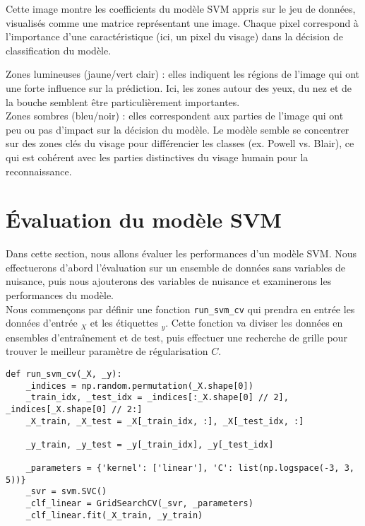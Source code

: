 \documentclass{article}
\begin{document}
\begin{itemize}
Cette image montre les coefficients du modèle SVM appris sur le jeu de
données, visualisés comme une matrice représentant une image. Chaque 
pixel correspond à l'importance d'une caractéristique (ici, un pixel du 
visage) dans la décision de classification du modèle.

Zones lumineuses (jaune/vert clair) : elles indiquent les régions de 
l'image qui ont une forte influence sur la prédiction. Ici, les zones 
autour des yeux, du nez et de la bouche semblent être particulièrement 
importantes.\\

Zones sombres (bleu/noir) : elles correspondent aux parties de l'image 
qui ont peu ou pas d'impact sur la décision du modèle.
Le modèle semble se concentrer sur des zones clés du visage pour 
différencier les classes (ex. Powell vs. Blair), ce qui est cohérent avec 
les parties distinctives du visage humain pour la reconnaissance.

\section{Évaluation du modèle SVM}

Dans cette section, nous allons évaluer les performances d'un modèle SVM.
Nous effectuerons d'abord l'évaluation sur un ensemble de données sans 
variables de nuisance, puis nous ajouterons des variables de nuisance et 
examinerons les performances du modèle.\\


Nous commençons par définir une fonction \texttt{run\_svm\_cv} qui 
prendra en entrée les données d'entrée \(_X\) et les étiquettes \(_y\). 
Cette fonction va diviser les données en ensembles d'entraînement et de 
test, puis effectuer une recherche de grille pour trouver le meilleur 
paramètre de régularisation \(C\).

\begin{verbatim}
def run_svm_cv(_X, _y):
    _indices = np.random.permutation(_X.shape[0])
    _train_idx, _test_idx = _indices[:_X.shape[0] // 2], _indices[_X.shape[0] // 2:]
    _X_train, _X_test = _X[_train_idx, :], _X[_test_idx, :]

    _y_train, _y_test = _y[_train_idx], _y[_test_idx]

    _parameters = {'kernel': ['linear'], 'C': list(np.logspace(-3, 3, 5))}
    _svr = svm.SVC()
    _clf_linear = GridSearchCV(_svr, _parameters)
    _clf_linear.fit(_X_train, _y_train)


\end{verbatim}
\end{itemize}
\end{document}
